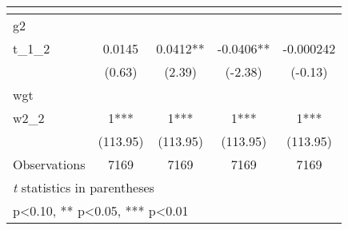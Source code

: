 \begin{table}[htbp]\centering
\def\sym#1{\ifmmode^{#1}\else\(^{#1}\)\fi}
\caption{ \label{tab1}}
\begin{tabular}{l*{4}{c}}
\toprule
                    &\multicolumn{1}{c}{}&\multicolumn{1}{c}{}&\multicolumn{1}{c}{}&\multicolumn{1}{c}{}\\
\midrule
g2                  &               &               &               &               \\
t\_1\_2               &      0.0145   &      0.0412** &     -0.0406** &   -0.000242   \\
                    &      (0.63)   &      (2.39)   &     (-2.38)   &     (-0.13)   \\
\midrule
wgt                 &               &               &               &               \\
w2\_2                &           1***&           1***&           1***&           1***\\
                    &    (113.95)   &    (113.95)   &    (113.95)   &    (113.95)   \\
\midrule
Observations        &        7169   &        7169   &        7169   &        7169   \\
\bottomrule
\multicolumn{5}{l}{\footnotesize \textit{t} statistics in parentheses}\\
\multicolumn{5}{l}{\footnotesize * p<0.10, ** p<0.05, *** p<0.01}\\
\end{tabular}
\end{table}
